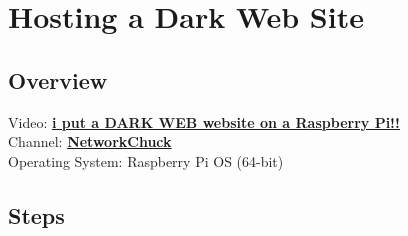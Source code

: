 \section{Hosting a Dark Web Site}

\subsection{Overview}
Video: \href{https://www.youtube.com/watch?v=bllS9tkCkaM}{\textbf{\color{blue}i put a DARK WEB website on a Raspberry Pi!!}} \\
Channel: \href{https://www.youtube.com/@NetworkChuck}{\textbf{\color{blue}NetworkChuck}} \\
Operating System: Raspberry Pi OS (64-bit)

\subsection{Steps}
